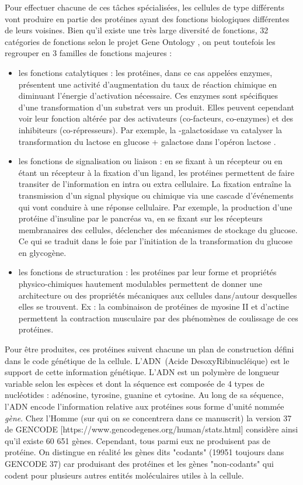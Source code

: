 Pour effectuer chacune de ces tâches spécialisées, les cellules de type différents vont produire en partie des protéines ayant des fonctions biologiques différentes de leurs voisines. Bien qu'il existe une très large diversité de fonctions, 32 catégories de fonctions selon le projet Gene Ontology \cite{Ashburner2000}, on peut toutefois les regrouper en 3 familles de fonctions majeures \cite{Mathews2012}:  
\begin{itemize}
    \item les fonctions catalytiques : les protéines, dans ce cas appelées enzymes, présentent une activité d'augmentation du taux de réaction chimique en diminuant l'énergie d'activation nécessaire. Ces enzymes sont spécifiques d'une transformation d'un substrat vers un produit. Elles peuvent cependant voir leur fonction altérée par des activateurs (co-facteurs, co-enzymes) et des inhibiteurs (co-répresseurs). Par exemple, la \textbeta-galactosidase va catalyser la transformation du lactose en glucose + galactose dans l'opéron lactose \cite{Jacob1961Jun}.
    \item les fonctions de signalisation ou liaison : en se fixant à un récepteur ou en étant un récepteur à la fixation d'un ligand, les protéines permettent de faire transiter de l'information en intra ou extra cellulaire. La fixation entraîne la transmission d'un signal physique ou chimique via une cascade d'événements qui vont conduire à une réponse cellulaire. Par exemple, la production d'une protéine d'insuline par le pancréas va, en se fixant sur les récepteurs membranaires des cellules, déclencher des mécanismes de stockage du glucose. Ce qui se traduit dans le foie par l'initiation de la transformation du glucose en glycogène.
    \item les fonctions de structuration : les protéines par leur forme et propriétés physico-chimiques hautement modulables permettent de donner une architecture ou des propriétés mécaniques aux cellules dans/autour desquelles elles se trouvent. Ex : la combinaison de protéines de myosine II et d'actine permettent la contraction musculaire par des phénomènes de coulissage de ces protéines.
\end{itemize}


Pour être produites, ces protéines suivent chacune un plan de construction défini dans le code génétique de la cellule. L'ADN~(Acide DesoxyRibinucléique) est le support de cette information génétique. L'ADN est un polymère de longueur variable selon les espèces et dont la séquence est composée de 4 types de nucléotides : adénosine, tyrosine, guanine et cytosine. Au long de sa séquence, l'ADN encode l'information relative aux protéines sous forme d'unité nommée \textit{gène}. Chez l'Homme (sur qui on se concentrera dans ce manuscrit) la version 37 de GENCODE [https://www.gencodegenes.org/human/stats.html] considère ainsi qu'il existe 60 651 gènes. Cependant, tous parmi eux ne produisent pas de protéine. On distingue en réalité les gènes dits "codants" (19951 toujours dans GENCODE 37) car produisant des protéines et les gènes "non-codants" qui codent pour plusieurs autres entités moléculaires utiles à la cellule.

